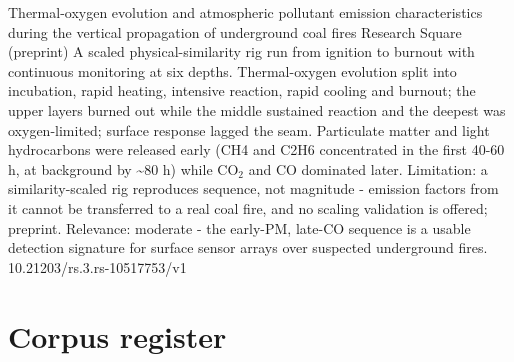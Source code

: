 \documentclass[10pt]{article}
\begin{document}
{Thermal-oxygen evolution and atmospheric pollutant emission characteristics during the vertical propagation of underground coal fires}
{Research Square (preprint)}
{A scaled physical-similarity rig run from ignition to burnout with continuous monitoring at six depths. Thermal-oxygen evolution split into incubation, rapid heating, intensive reaction, rapid cooling and burnout; the upper layers burned out while the middle sustained reaction and the deepest was oxygen-limited; surface response lagged the seam. Particulate matter and light hydrocarbons were released early (CH4 and C2H6 concentrated in the first 40-60 h, at background by \textasciitilde{}80 h) while CO$_2$ and CO dominated later. Limitation: a similarity-scaled rig reproduces sequence, not magnitude - emission factors from it cannot be transferred to a real coal fire, and no scaling validation is offered; preprint. Relevance: moderate - the early-PM, late-CO sequence is a usable detection signature for surface sensor arrays over suspected underground fires.}
{10.21203/rs.3.rs-10517753/v1}

\clearpage
\section*{\sffamily\bfseries\color{Deep}Corpus register}
\vspace{-1.5mm}{\color{Amber}\rule{\linewidth}{1.1pt}}\vspace{2.5mm}



\vspace{2mm}
\end{document}
